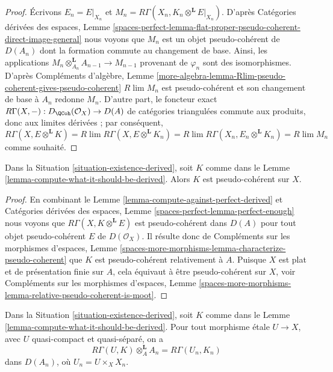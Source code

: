 \begin{proof}
Écrivons $E_n = E|_{X_n}$ et
$M_n = R\Gamma(X_n, K_n \otimes^\mathbf{L} E|_{X_n})$.
D'après Catégories dérivées des espaces, Lemme
\ref{spaces-perfect-lemma-flat-proper-pseudo-coherent-direct-image-general}
nous voyons que $M_n$ est un objet pseudo-cohérent de $D(A_n)$
dont la formation commute au changement de base. Ainsi, les applications
$M_n \otimes_{A_n}^\mathbf{L} A_{n - 1} \to M_{n - 1}$
provenant de $\varphi_n$ sont des isomorphismes. D'après
Compléments d'algèbre, Lemme
\ref{more-algebra-lemma-Rlim-pseudo-coherent-gives-pseudo-coherent}
$R\lim M_n$ est pseudo-cohérent et
son changement de base à $A_n$ redonne $M_n$.
D'autre part, le foncteur exact
$R\Gamma(X, -) : D_\QCoh(\mathcal{O}_X) \to D(A)$
de catégories triangulées commute aux produits,
donc aux limites dérivées ; par conséquent,
$$
R\Gamma(X, E \otimes^\mathbf{L} K) =
R\lim R\Gamma(X,  E \otimes^\mathbf{L} K_n) =
R\lim R\Gamma(X_n, E_n \otimes^\mathbf{L} K_n) =
R\lim M_n
$$
comme souhaité.
\end{proof}

\begin{lemma}
\label{lemma-relative-pseudo-coherence-derived}
Dans la Situation \ref{situation-existence-derived}, soit $K$ comme dans le
Lemme \ref{lemma-compute-what-it-should-be-derived}. Alors $K$
est pseudo-cohérent sur $X$.
\end{lemma}

\begin{proof}
En combinant le Lemme \ref{lemma-compute-against-perfect-derived} et
Catégories dérivées des espaces, Lemme
\ref{spaces-perfect-lemma-perfect-enough}
nous voyons que $R\Gamma(X, K \otimes^\mathbf{L} E)$
est pseudo-cohérent dans $D(A)$ pour tout objet pseudo-cohérent
$E$ de $D(\mathcal{O}_X)$. Il résulte donc de
Compléments sur les morphismes d'espaces, Lemme
\ref{spaces-more-morphisms-lemma-characterize-pseudo-coherent}
que $K$ est pseudo-cohérent relativement à $A$.
Puisque $X$ est plat et de présentation finie
sur $A$, cela équivaut à être pseudo-cohérent sur $X$, voir
Compléments sur les morphismes d'espaces, Lemme
\ref{spaces-more-morphisms-lemma-relative-pseudo-coherent-is-moot}.
\end{proof}

\begin{lemma}
\label{lemma-compute-over-affine-derived}
Dans la Situation \ref{situation-existence-derived}, soit $K$ comme dans le
Lemme \ref{lemma-compute-what-it-should-be-derived}. Pour tout
morphisme \'etale $U \to X$, avec $U$ quasi-compact et quasi-séparé, on a
$$
R\Gamma(U, K) \otimes_A^\mathbf{L} A_n =
R\Gamma(U_n, K_n)
$$
dans $D(A_n)$, où $U_n = U \times_X X_n$.
\end{lemma}

